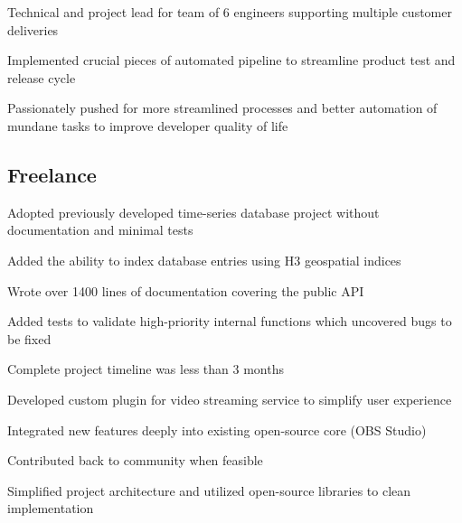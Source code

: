 \documentclass[letterpaper]{deedy-resume}
\newcommand{\experiencespace}{\vspace{2ex}}
\begin{document}
\begin{minipage}[t]{0.70\textwidth}
    \begin{compactitem}
        \item Technical and project lead for team of 6 engineers supporting multiple customer deliveries
        \item Implemented crucial pieces of automated pipeline to streamline product test and release cycle
        \item Passionately pushed for more streamlined processes and better automation of mundane tasks to
            improve developer quality of life
    \end{compactitem}
    \experiencespace

    \subsection{Freelance}
    \begin{compactitem}
        \item Adopted previously developed time-series database project without documentation and minimal tests
        \item Added the ability to index database entries using H3 geospatial indices
        \item Wrote over 1400 lines of documentation covering the public API
        \item Added tests to validate high-priority internal functions which uncovered bugs to be fixed
        \item Complete project timeline was less than 3 months
    \end{compactitem}
    \experiencespace

    \begin{compactitem}
        \item Developed custom plugin for video streaming service to simplify user experience
        \item Integrated new features deeply into existing open-source core (OBS Studio)
        \item Contributed back to community when feasible
        \item Simplified project architecture and utilized open-source libraries to clean implementation
    \end{compactitem}
    \experiencespace


\end{minipage}
\end{document}
